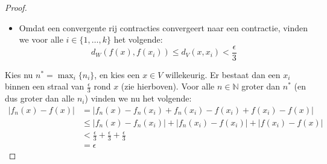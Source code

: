 \documentclass[main.tex]{subfiles}
\begin{document}
\begin{st}
\begin{proof}
\begin{itemize}
    \item Omdat een convergente rij contracties convergeert naar een contractie, vinden we voor alle $i\in\{1,\dotsc,k\}$ het volgende:
      \[ d_{W}(f(x),f(x_{i})) \le d_{V}(x,x_{i}) < \frac{\epsilon}{3} \]
    \end{itemize}
    Kies nu $n^{*} = \max_{i}\{ n_{i}\}$, en kies een $x\in V$ willekeurig.
    Er bestaat dan een $x_{i}$ binnen een straal van $\frac{\epsilon}{3}$ rond $x$ (zie hierboven).
    Voor alle $n\in \mathbb{N}$ groter dan $n^{*}$ (en dus groter dan alle $n_{i}$) vinden we nu het volgende:
    \begin{align*}
      |f_{n}(x) - f(x)|
      &= |f_{n}(x) - f_{n}(x_{i}) + f_{n}(x_{i}) - f(x_{i}) + f(x_{i}) - f(x)|\\
      &\le |f_{n}(x) - f_{n}(x_{i})| + |f_{n}(x_{i}) - f(x_{i})| + |f(x_{i}) - f(x)|\\
      &< \frac{\epsilon}{3} + \frac{\epsilon}{3} +\frac{\epsilon}{3}\\
      &= \epsilon
    \end{align*}
  \end{proof}
\end{st}
\end{document}
